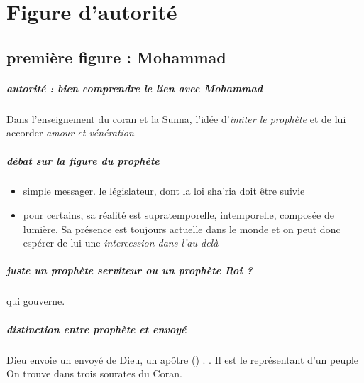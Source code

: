 \chapter{Figure d'autorité}


\section{première figure : Mohammad}
\paragraph{autorité : bien comprendre le lien avec Mohammad} Dans l'enseignement du coran et la Sunna, l'idée d'\textit{imiter le prophète} et de lui accorder \textit{amour et vénération}

\paragraph{débat sur la figure du prophète} 

\begin{itemize}
    \item simple messager. le législateur, dont la loi sha'ria doit être suivie
    \item pour certains, sa réalité est supratemporelle, intemporelle, composée de lumière. Sa présence est toujours actuelle dans le monde et on peut donc espérer de lui une \textit{intercession dans l'au delà}
\end{itemize}

\paragraph{juste un prophète serviteur ou un prophète Roi ?} qui gouverne. 

\paragraph{distinction entre prophète et envoyé} 
\paragraph{\Rasul}  Dieu envoie un envoyé de Dieu, un apôtre (\Rasul) . . Il est le représentant d'un peuple
On trouve {\Rasul} dans trois sourates du Coran.

